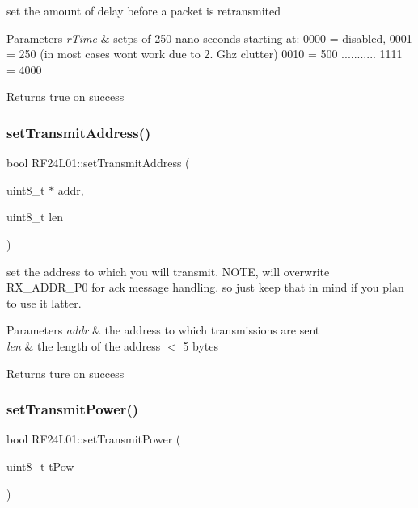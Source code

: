 set the amount of delay before a packet is retransmited 
\begin{DoxyParams}{Parameters}
{\em r\+Time} & setps of 250 nano seconds starting at\+: 0000 = disabled, 0001 = 250 (in most cases wont work due to 2. Ghz clutter) 0010 = 500 ........... 1111 = 4000 \\
\hline
\end{DoxyParams}
\begin{DoxyReturn}{Returns}
true on success 
\end{DoxyReturn}
\mbox{\label{namespace_r_f24_l01_a03d3bd840dfe193317329eb84c029685}} 
\subsubsection{\texorpdfstring{set\+Transmit\+Address()}{setTransmitAddress()}}
{\footnotesize\ttfamily bool R\+F24\+L01\+::set\+Transmit\+Address (\begin{DoxyParamCaption}\item[{uint8\+\_\+t $\ast$}]{addr,  }\item[{uint8\+\_\+t}]{len }\end{DoxyParamCaption})}

set the address to which you will transmit. N\+O\+TE, will overwrite R\+X\+\_\+\+A\+D\+D\+R\+\_\+\+P0 for ack message handling. so just keep that in mind if you plan to use it latter. 
\begin{DoxyParams}{Parameters}
{\em addr} & the address to which transmissions are sent \\
\hline
{\em len} & the length of the address $<$ 5 bytes \\
\hline
\end{DoxyParams}
\begin{DoxyReturn}{Returns}
ture on success 
\end{DoxyReturn}
\mbox{\label{namespace_r_f24_l01_a012e78392bee3ef90f145794be638eac}} 
\subsubsection{\texorpdfstring{set\+Transmit\+Power()}{setTransmitPower()}}
{\footnotesize\ttfamily bool R\+F24\+L01\+::set\+Transmit\+Power (\begin{DoxyParamCaption}\item[{uint8\+\_\+t}]{t\+Pow }\end{DoxyParamCaption})}

